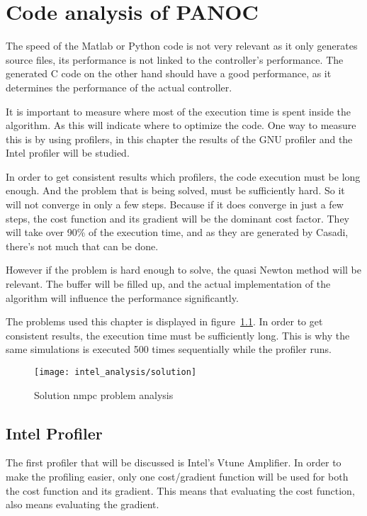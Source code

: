 \chapter{Code analysis of PANOC}
The speed of the Matlab or Python code is not very relevant as it only generates source files, its performance is not linked to the controller's performance. The generated C code on the other hand should have a good performance, as it determines the performance of the actual controller.

It is important to measure where most of the execution time is spent inside the algorithm. As this will indicate where to optimize the code. One way to measure this is by using profilers, in this chapter the results of the GNU profiler and the Intel profiler will be studied.

In order to get consistent results which profilers, the code execution must be long enough. And the problem that is being solved, must be sufficiently hard. So it will not converge in only a few steps. Because if it does converge in just a few steps, the cost function and its gradient will be the dominant cost factor. They will take over 90\% of the execution time, and as they are generated by Casadi, there's not much that can be done.

However if the problem is hard enough to solve, the quasi Newton method will be relevant. The buffer will be filled up, and the actual implementation of the algorithm will influence the performance significantly.

The problems used this chapter is displayed in figure~\ref{fig:solution nmpc problem analysis}. In order to get consistent results, the execution time must be sufficiently long. This is why the same simulations is executed 500 times sequentially while the profiler runs.

\begin{figure}[H]
	\centering
	\texttt{[image: intel\_analysis/solution]}
	\caption{Solution nmpc problem analysis}
	\label{fig:solution nmpc problem analysis}
\end{figure}

\section{Intel Profiler}
The first profiler that will be discussed is Intel's Vtune Amplifier. In order to make the profiling easier, only one cost/gradient function will be used for both the cost function and its gradient. This means that evaluating the cost function, also means evaluating the gradient.

